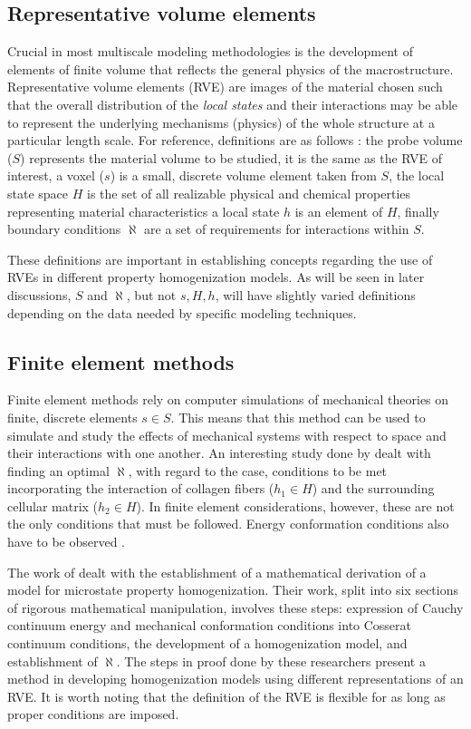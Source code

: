 \subsection{Representative volume elements}

Crucial in most multiscale modeling methodologies is the development of elements of finite volume that reflects the general physics of the macrostructure.
Representative volume elements (RVE) are images of the material chosen such that the overall distribution of the \emph{local states} and their interactions may be able to represent the underlying mechanisms (physics) of the whole structure at a particular length scale.
For reference, definitions are as follows \cite{bone,bunge,cnn,gupta15,polar,sun17,yabansu14}: the probe volume ($S$) represents the material volume to be studied, it is the same as the RVE of interest, a voxel ($s$) is a small, discrete volume element taken from $S$, the local state space $H$ is the set of all realizable physical and chemical properties representing material characteristics a local state $h$ is an element of $H$, finally boundary conditions $\aleph$ are a set of requirements for interactions within $S$.

These definitions are important in establishing concepts regarding the use of RVEs in different property homogenization models.
As will be seen in later discussions, $S$ and $\aleph$, but not $s, H, h$, will have slightly varied definitions depending on the data needed by specific modeling techniques.

\subsection{Finite element methods}

Finite element methods rely on computer simulations of mechanical theories on finite, discrete elements $s \in S$.
This means that this method can be used to simulate and study the effects of mechanical systems with respect to space and their interactions with one another.
An interesting study done by  dealt with finding an optimal $\aleph$, with regard to the case, conditions to be met incorporating the interaction of collagen fibers ($h_1 \in H$) and the surrounding cellular matrix ($h_2 \in H$).
In finite element considerations, however, these are not the only conditions that must be followed.
Energy conformation conditions also have to be observed \cite{cosserat}.

The work of  dealt with the establishment of a mathematical derivation of a model for microstate property homogenization.
Their work, split into six sections of rigorous mathematical manipulation, involves these steps: expression of Cauchy continuum energy and mechanical conformation conditions into Cosserat continuum conditions, the development of a homogenization model, and establishment of $\aleph$.
The steps in proof done by these researchers present a method in developing homogenization models using different representations of an RVE.
It is worth noting that the definition of the RVE is flexible for as long as proper conditions are imposed.

